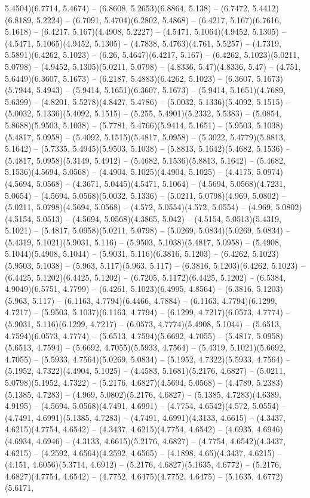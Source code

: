 5.4504)(6.7714, 5.4674) -- (6.8608, 5.2653)(6.8864, 5.138) -- (6.7472, 5.4412)(6.8189, 5.2224) -- (6.7091, 5.4704)(6.2802, 5.4868) -- (6.4217, 5.167)(6.7616, 5.1618) -- (6.4217, 5.167)(4.4908, 5.2227) -- (4.5471, 5.1064)(4.9452, 5.1305) -- (4.5471, 5.1065)(4.9452, 5.1305) -- (4.7838, 5.4763)(4.761, 5.5257) -- (4.7319, 5.5891)(6.4262, 5.1023) -- (6.26, 5.4647)(6.4217, 5.167) -- (6.4262, 5.1023)(5.0211, 5.0798) -- (4.9452, 5.1305)(5.0211, 5.0798) -- (4.8336, 5.47)(4.8336, 5.47) -- (4.751, 5.6449)(6.3607, 5.1673) -- (6.2187, 5.4883)(6.4262, 5.1023) -- (6.3607, 5.1673)(5.7944, 5.4943) -- (5.9414, 5.1651)(6.3607, 5.1673) -- (5.9414, 5.1651)(4.7689, 5.6399) -- (4.8201, 5.5278)(4.8427, 5.4786) -- (5.0032, 5.1336)(5.4092, 5.1515) -- (5.0032, 5.1336)(5.4092, 5.1515) -- (5.255, 5.4901)(5.2332, 5.5383) -- (5.0854, 5.8688)(5.9503, 5.1038) -- (5.7781, 5.4766)(5.9414, 5.1651) -- (5.9503, 5.1038)(5.4817, 5.0958) -- (5.4092, 5.1515)(5.4817, 5.0958) -- (5.3022, 5.4779)(5.8813, 5.1642) -- (5.7335, 5.4945)(5.9503, 5.1038) -- (5.8813, 5.1642)(5.4682, 5.1536) -- (5.4817, 5.0958)(5.3149, 5.4912) -- (5.4682, 5.1536)(5.8813, 5.1642) -- (5.4682, 5.1536)(4.5694, 5.0568) -- (4.4904, 5.1025)(4.4904, 5.1025) -- (4.4175, 5.0974)(4.5694, 5.0568) -- (4.3671, 5.0445)(4.5471, 5.1064) -- (4.5694, 5.0568)(4.7231, 5.0654) -- (4.5694, 5.0568)(5.0032, 5.1336) -- (5.0211, 5.0798)(4.969, 5.0802) -- (5.0211, 5.0798)(4.5694, 5.0568) -- (4.572, 5.0554)(4.572, 5.0554) -- (4.969, 5.0802)(4.5154, 5.0513) -- (4.5694, 5.0568)(4.3865, 5.042) -- (4.5154, 5.0513)(5.4319, 5.1021) -- (5.4817, 5.0958)(5.0211, 5.0798) -- (5.0269, 5.0834)(5.0269, 5.0834) -- (5.4319, 5.1021)(5.9031, 5.116) -- (5.9503, 5.1038)(5.4817, 5.0958) -- (5.4908, 5.1044)(5.4908, 5.1044) -- (5.9031, 5.116)(6.3816, 5.1203) -- (6.4262, 5.1023)(5.9503, 5.1038) -- (5.963, 5.117)(5.963, 5.117) -- (6.3816, 5.1203)(6.4262, 5.1023) -- (6.4425, 5.1202)(6.4425, 5.1202) -- (6.7205, 5.1172)(6.4425, 5.1202) -- (6.5384, 4.9049)(6.5751, 4.7799) -- (6.4261, 5.1023)(6.4995, 4.8564) -- (6.3816, 5.1203)(5.963, 5.117) -- (6.1163, 4.7794)(6.4466, 4.7884) -- (6.1163, 4.7794)(6.1299, 4.7217) -- (5.9503, 5.1037)(6.1163, 4.7794) -- (6.1299, 4.7217)(6.0573, 4.7774) -- (5.9031, 5.116)(6.1299, 4.7217) -- (6.0573, 4.7774)(5.4908, 5.1044) -- (5.6513, 4.7594)(6.0573, 4.7774) -- (5.6513, 4.7594)(5.6692, 4.7055) -- (5.4817, 5.0958)(5.6513, 4.7594) -- (5.6692, 4.7055)(5.5933, 4.7564) -- (5.4319, 5.1021)(5.6692, 4.7055) -- (5.5933, 4.7564)(5.0269, 5.0834) -- (5.1952, 4.7322)(5.5933, 4.7564) -- (5.1952, 4.7322)(4.4904, 5.1025) -- (4.4583, 5.1681)(5.2176, 4.6827) -- (5.0211, 5.0798)(5.1952, 4.7322) -- (5.2176, 4.6827)(4.5694, 5.0568) -- (4.4789, 5.2383)(5.1385, 4.7283) -- (4.969, 5.0802)(5.2176, 4.6827) -- (5.1385, 4.7283)(4.6389, 4.9195) -- (4.5694, 5.0568)(4.7491, 4.6991) -- (4.7754, 4.6542)(4.572, 5.0554) -- (4.7491, 4.6991)(5.1385, 4.7283) -- (4.7491, 4.6991)(4.3133, 4.6615) -- (4.3437, 4.6215)(4.7754, 4.6542) -- (4.3437, 4.6215)(4.7754, 4.6542) -- (4.6935, 4.6946)(4.6934, 4.6946) -- (4.3133, 4.6615)(5.2176, 4.6827) -- (4.7754, 4.6542)(4.3437, 4.6215) -- (4.2592, 4.6564)(4.2592, 4.6565) -- (4.1898, 4.65)(4.3437, 4.6215) -- (4.151, 4.6056)(5.3714, 4.6912) -- (5.2176, 4.6827)(5.1635, 4.6772) -- (5.2176, 4.6827)(4.7754, 4.6542) -- (4.7752, 4.6475)(4.7752, 4.6475) -- (5.1635, 4.6772)(5.6171, 